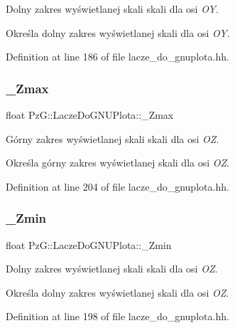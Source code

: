 Dolny zakres wyświetlanej skali skali dla osi {\itshape OY}. 

Określa dolny zakres wyświetlanej skali dla osi {\itshape OY}. 

Definition at line 186 of file lacze\+\_\+do\+\_\+gnuplota.\+hh.

\mbox{\label{class_pz_g_1_1_lacze_do_g_n_u_plota_a26949eedd421832f0f206ce3c8f90694}} 
\subsubsection{\texorpdfstring{\+\_\+\+Zmax}{\_Zmax}}
{\footnotesize\ttfamily float Pz\+G\+::\+Lacze\+Do\+G\+N\+U\+Plota\+::\+\_\+\+Zmax\hspace{0.3cm}{\ttfamily [protected]}}



Górny zakres wyświetlanej skali skali dla osi {\itshape OZ}. 

Określa górny zakres wyświetlanej skali dla osi {\itshape OZ}. 

Definition at line 204 of file lacze\+\_\+do\+\_\+gnuplota.\+hh.

\mbox{\label{class_pz_g_1_1_lacze_do_g_n_u_plota_a8f9797e881df35f4206cb7d8030e5edc}} 
\subsubsection{\texorpdfstring{\+\_\+\+Zmin}{\_Zmin}}
{\footnotesize\ttfamily float Pz\+G\+::\+Lacze\+Do\+G\+N\+U\+Plota\+::\+\_\+\+Zmin\hspace{0.3cm}{\ttfamily [protected]}}



Dolny zakres wyświetlanej skali skali dla osi {\itshape OZ}. 

Określa dolny zakres wyświetlanej skali dla osi {\itshape OZ}. 

Definition at line 198 of file lacze\+\_\+do\+\_\+gnuplota.\+hh.

